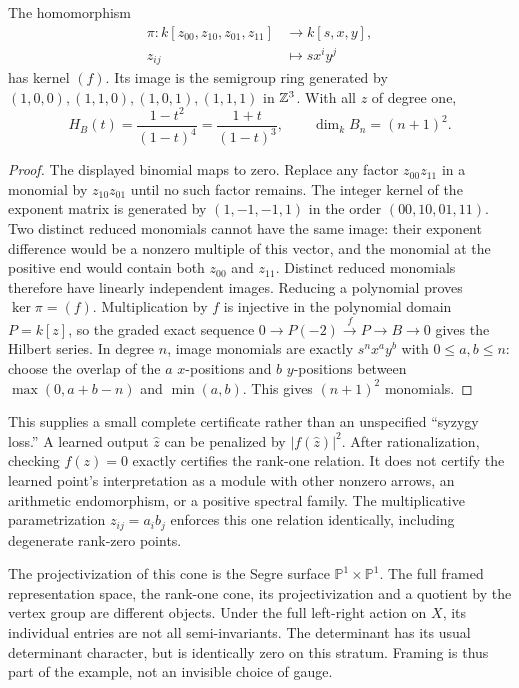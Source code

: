 \begin{proposition}\label{tg:segre}
The homomorphism
\[
 \begin{split}
 \pi:k[z_{00},z_{10},z_{01},z_{11}]&\longrightarrow k[s,x,y],\\
 z_{ij}&\longmapsto sx^iy^j
 \end{split}
\]
has kernel $(f)$. Its image is the semigroup ring generated by
$(1,0,0),(1,1,0),(1,0,1),(1,1,1)$ in $\mathbb Z^3$.
With all $z$ of degree one,
\[
 H_B(t)=\frac{1-t^2}{(1-t)^4}
       =\frac{1+t}{(1-t)^3},\qquad \dim_kB_n=(n+1)^2.
\]
\end{proposition}
\begin{proof}
The displayed binomial maps to zero. Replace any factor $z_{00}z_{11}$
in a monomial by $z_{10}z_{01}$ until no such factor remains. The integer
kernel of the exponent matrix is generated by $(1,-1,-1,1)$ in the
order $(00,10,01,11)$. Two distinct reduced monomials cannot have the same
image: their exponent difference would be a nonzero multiple of this
vector, and the monomial at the positive end would contain both
$z_{00}$ and $z_{11}$. Distinct reduced monomials therefore have linearly
independent images. Reducing a polynomial proves $\ker\pi=(f)$.
Multiplication by $f$ is injective in the polynomial domain $P=k[z]$,
so the graded exact sequence
$0\to P(-2)\xrightarrow{f}P\to B\to0$ gives the Hilbert series.
In degree $n$, image monomials are exactly $s^nx^ay^b$ with
$0\leq a,b\leq n$: choose the overlap of the $a$ $x$-positions and
$b$ $y$-positions between $\max(0,a+b-n)$ and $\min(a,b)$.
This gives $(n+1)^2$ monomials.
\end{proof}

This supplies a small complete certificate rather than an unspecified
``syzygy loss.'' A learned output $\widehat z$ can be penalized by
$|f(\widehat z)|^2$. After rationalization, checking $f(z)=0$ exactly
certifies the rank-one relation. It does not certify the learned point's
interpretation as a module with other nonzero arrows, an arithmetic
endomorphism, or a positive spectral family. The multiplicative
parametrization $z_{ij}=a_i b_j$ enforces this one relation identically,
including degenerate rank-zero points.

The projectivization of this cone is the Segre surface
$\mathbb P^1\times\mathbb P^1$. The full framed representation space,
the rank-one cone, its projectivization and a quotient by the vertex group
are different objects. Under the full left-right action on $X$, its
individual entries are not all semi-invariants. The determinant has its
usual determinant character, but is identically zero on this stratum.
Framing is thus part of the example, not an invisible choice of gauge.

